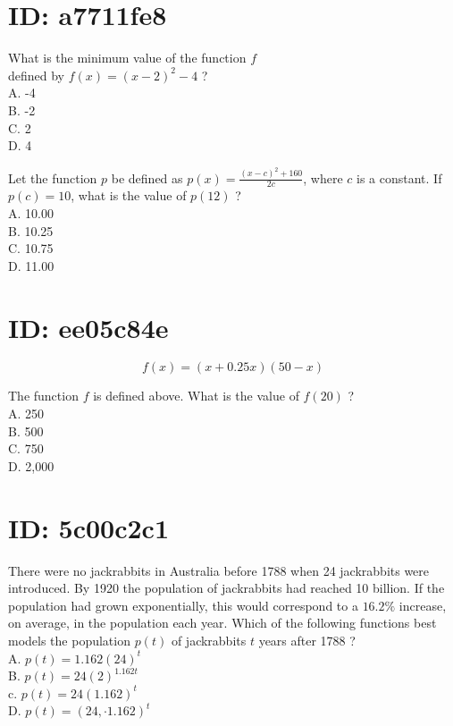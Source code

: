 \section*{ID: a7711fe8}
What is the minimum value of the function $f$\\
defined by $f(x)=(x-2)^{2}-4$ ?\\
A. -4\\
B. -2\\
C. 2\\
D. 4

Let the function $p$ be defined as $p(x)=\frac{(x-c)^{2}+160}{2 c}$, where $c$ is a constant. If $p(c)=10$, what is the value of $p(12)$ ?\\
A. 10.00\\
B. 10.25\\
C. 10.75\\
D. 11.00

\section*{ID: ee05c84e}
$$
f(x)=(x+0.25 x)(50-x)
$$

The function $f$ is defined above. What is the value of $f(20)$ ?\\
A. 250\\
B. 500\\
C. 750\\
D. 2,000

\section*{ID: 5c00c2c1}
There were no jackrabbits in Australia before 1788 when 24 jackrabbits were introduced. By 1920 the population of jackrabbits had reached 10 billion. If the population had grown exponentially, this would correspond to a $16.2 \%$ increase, on average, in the population each year. Which of the following functions best models the population $p(t)$ of jackrabbits $t$ years after 1788 ?\\
A. $p(t)=1.162(24)^{t}$\\
B. $p(t)=24(2)^{1.162 t}$\\
c. $p(t)=24(1.162)^{t}$\\
D. $p(t)=(24, \cdot 1.162)^{t}$


